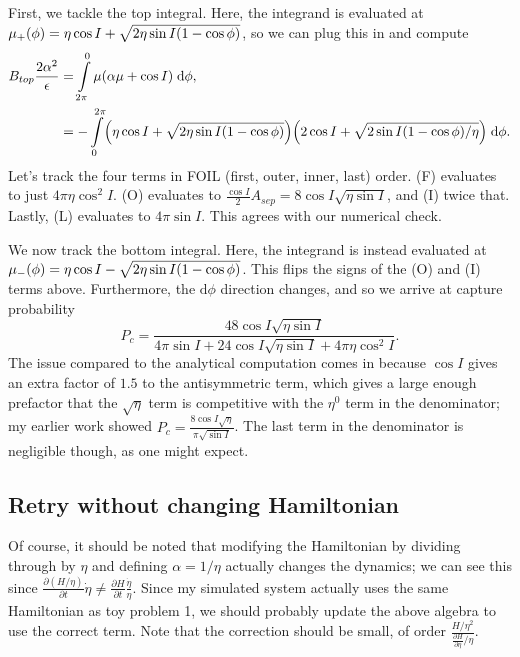 \documentclass[11pt,
        usenames, %
        dvipsnames %
    ]{article}
\newcommand*{\pd}[2]{\frac{\partial#1}{\partial#2}}
\DeclarePairedDelimiter\p{\lparen}{\rparen}
\begin{document}
First, we tackle the top integral. Here, the integrand is evaluated at
$\mu_+(\phi) = \eta \cos I + \sqrt{2\eta \sin I\p*{1 - \cos \phi}}$, so we can
plug this in and compute
\begin{align*}
    B_{top}\frac{2\alpha^2}{\epsilon} &= \int\limits_{2\pi}^{0}
            \mu(\alpha \mu + \cos I)\;\mathrm{d}\phi,\\
        &= -\int\limits_0^{2\pi}
            \p*{\eta \cos I + \sqrt{2\eta \sin I\p*{1 - \cos \phi}}}
                \p*{2\cos I + \sqrt{2\sin I\p*{1 - \cos \phi}/\eta}}
                \;\mathrm{d}\phi.
\end{align*}
Let's track the four terms in FOIL (first, outer, inner, last) order. (F)
evaluates to just $4\pi \eta \cos^2 I$. (O) evaluates to $\frac{\cos
I}{2}A_{sep} = 8\cos I\sqrt{\eta \sin I}$, and (I) twice that. Lastly, (L)
evaluates to $4\pi \sin I$. This agrees with our numerical check.

We now track the bottom integral. Here, the integrand is instead evaluated at
$\mu_-(\phi) = \eta \cos I - \sqrt{2\eta \sin I\p*{1 - \cos \phi}}$. This flips
the signs of the (O) and (I) terms above. Furthermore, the $\mathrm{d}\phi$
direction changes, and so we arrive at capture probability
\begin{equation}
    P_{c} = \frac{48\cos I \sqrt{\eta \sin I}}{
        4\pi \sin I + 24\cos I \sqrt{\eta \sin I} + 4\pi \eta \cos^2 I}.
\end{equation}
The issue compared to the analytical computation comes in because $\cos I$ gives
an extra factor of $1.5$ to the antisymmetric term, which gives a large enough
prefactor that the $\sqrt{\eta}$ term is competitive with the $\eta^0$ term in
the denominator; my earlier work showed $P_c = \frac{8\cos
I\sqrt{\eta}}{\pi \sqrt{\sin I}}$. The last term in the denominator is
negligible though, as one might expect.

\subsection{Retry without changing Hamiltonian}

Of course, it should be noted that modifying the Hamiltonian by dividing through
by $\eta$ and defining $\alpha = 1/\eta$ actually changes the dynamics; we can
see this since $\pd{(H/\eta)}{t}\dot{\eta} \neq
\pd{H}{t}\frac{\dot{\eta}}{\eta}$. Since my simulated system actually uses the
same Hamiltonian as toy problem 1, we should probably update the above algebra
to use the correct term. Note that the correction should be small, of order
$\frac{H/\eta^2}{\pd{H}{\eta}/\eta}$.
\end{document}
